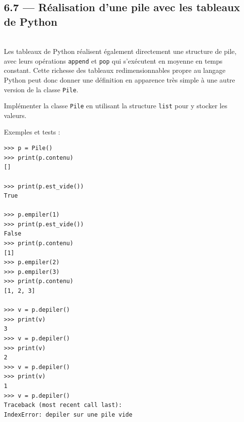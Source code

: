 \documentclass[a4paper,17pt]{extarticle}
\newenvironment{eleve}%
{\begin{activite}\color{noiramu}\\[-0.5cm]}
{\end{activite}}
\begin{document}
    \hypertarget{ruxe9alisation-dune-pile-avec-les-tableaux-de-python}{%
\subsection{6.7 --- Réalisation d'une pile avec les tableaux de
Python}\label{ruxe9alisation-dune-pile-avec-les-tableaux-de-python}}
\begin{eleve}
    Les tableaux de Python réalisent également directement une structure de
pile, avec leurs opérations \texttt{append} et \texttt{pop} qui
s'exécutent en moyenne en temps constant. Cette richesse des tableaux
redimensionnables propre au langage Python peut donc donner une
définition en apparence très simple à une autre version de la classe
\texttt{Pile}.

Implémenter la classe \texttt{Pile} en utilisant la structure
\texttt{list} pour y stocker les valeurs.

Exemples et tests :

\begin{verbatim}
>>> p = Pile()
>>> print(p.contenu)
[]

>>> print(p.est_vide())
True

>>> p.empiler(1)
>>> print(p.est_vide())
False
>>> print(p.contenu)
[1]
>>> p.empiler(2)
>>> p.empiler(3)
>>> print(p.contenu)
[1, 2, 3]

>>> v = p.depiler()
>>> print(v)
3
>>> v = p.depiler()
>>> print(v)
2
>>> v = p.depiler()
>>> print(v)
1
>>> v = p.depiler()
Traceback (most recent call last):
IndexError: depiler sur une pile vide
 
\end{verbatim}
        
        \end{eleve}
\end{document}
